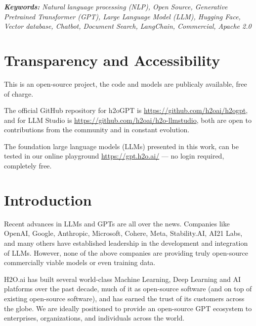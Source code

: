 \documentclass{article}
\begin{document}
\begin{adjustwidth}{37pt}{37pt}
\emph{\textbf{ Keywords:} Natural language processing (NLP), Open Source, Generative Pretrained Transformer (GPT), Large Language Model (LLM), Hugging Face, Vector database, Chatbot, Document Search, LangChain, Commercial, Apache 2.0}
\end{adjustwidth}


\clearpage

\tableofcontents

\vspace{8mm}
\section*{Transparency and Accessibility}
This is an open-source project, the code and models are publicaly available, free of charge. 

The official GitHub repository for h2oGPT is \url{https://github.com/h2oai/h2ogpt}, and for LLM Studio is \url{https://github.com/h2oai/h2o-llmstudio}, both are open to contributions from the community and in constant evolution.

The foundation large language models (LLMs) presented in this work, can be tested in our online playground \url{https://gpt.h2o.ai/} --- no login required, completely free.

\clearpage

\section{Introduction}
Recent advances in LLMs and GPTs are all over the news. Companies like OpenAI, Google, Anthropic, Microsoft, Cohere, Meta, Stability.AI, AI21 Labs, and many others have established leadership in the development and integration of LLMs. However, none of the above companies are providing truly open-source commercially viable models or even training data.


H2O.ai has built several world-class Machine Learning, Deep Learning and AI platforms over the past decade, much of it as open-source software (and on top of existing open-source software), and has earned the trust of its customers across the globe. We are ideally positioned to provide an open-source GPT ecosystem to enterprises, organizations, and individuals across the world.
\end{document}
